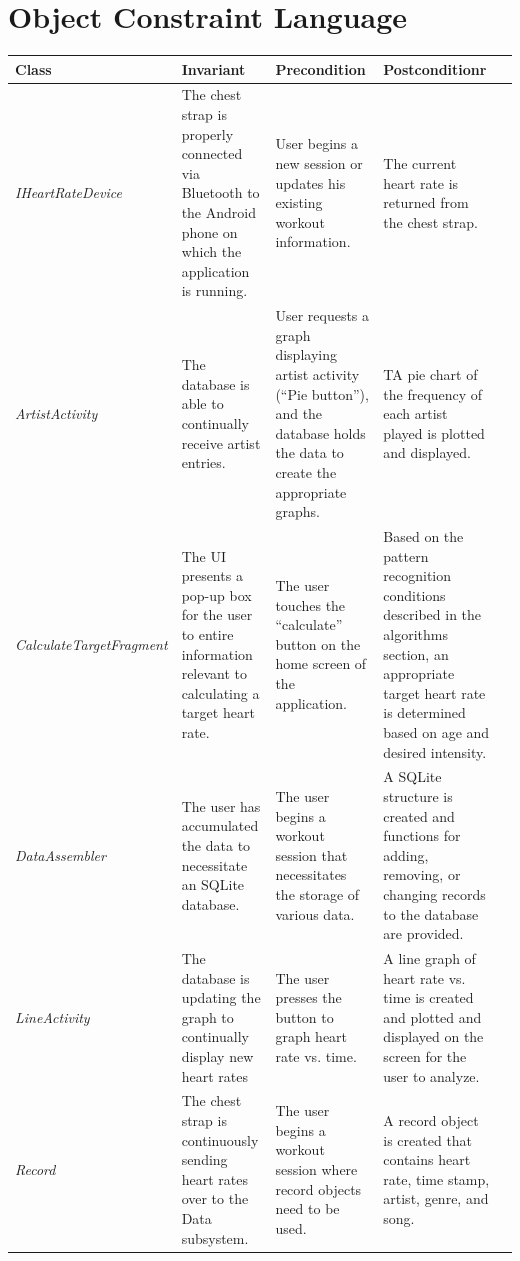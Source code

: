\documentclass[letterpaper,english, 12pt]{scrreprt}
\begin{document}
\section{Object Constraint Language}
\begin{center}
\begin{tabular}{|l|C{4cm}|C{4cm}|C{4cm}|C{4cm}|}
 		\hline
 		\textbf{Class}	&	\textbf{Invariant}	&	\textbf{Precondition}	& \textbf{Postconditionr}		\\ \hline
 
 \textit{IHeartRateDevice}		&	The chest strap is properly connected via Bluetooth to the Android phone on which the application is running.	&	User begins a new session or updates his existing workout information. 										&	The current heart rate is returned from the chest strap.						\\ \hline
 \textit{ArtistActivity}			&	The database is able to continually receive artist entries.									&	User requests a graph displaying artist activity (“Pie button”), and the database holds the data to create the appropriate graphs.	&	TA pie chart of the frequency of each artist played is plotted and displayed.		\\ \hline
 \textit{CalculateTargetFragment}	&	The UI presents a pop-up box for the user to entire information relevant to calculating a target heart rate.	&	The user touches the “calculate” button on the home screen of the application.									&	Based on the pattern recognition conditions described in the algorithms section, an appropriate target heart rate is determined based on age and desired intensity.	\\ \hline
 \textit{DataAssembler}			&	The user has accumulated the data to necessitate an SQLite database.							&	The user begins a workout session that necessitates the storage of various data.								&	A SQLite structure is created and functions for adding, removing, or changing records to the database are provided.	\\ \hline
 \textit{LineActivity}			&	The database is updating the graph to continually display new heart rates 						&	The user presses the button to graph heart rate vs. time.												&	A line graph of heart rate vs. time is created and plotted and displayed on the screen for the user to analyze.		\\ \hline
 \textit{Record}				&	The chest strap is continuously sending heart rates over to the Data subsystem.					&	The user begins a workout session where record objects need to be used.								 	&	A record object is created that contains heart rate, time stamp, artist, genre, and song.		\\ \hline

\end{tabular}
\end{center}
\end{document}
